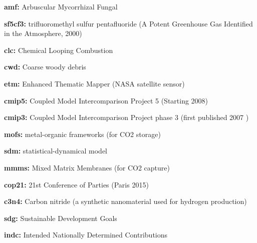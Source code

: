 \documentclass{article}
\begin{document}
\begin{linenumbers}
\noindent\textbf{amf:}  Arbuscular Mycorrhizal Fungal

\noindent\textbf{sf5cf3:} trifluoromethyl sulfur pentafluoride (A Potent Greenhouse Gas Identified in the Atmosphere, 2000)

\noindent\textbf{clc:} Chemical Looping Combustion

\noindent\textbf{cwd:} Coarse woody debris

\noindent\textbf{etm:} Enhanced Thematic Mapper (NASA satellite sensor)

\noindent\textbf{cmip5:} Coupled Model Intercomparison Project 5 (Starting 2008)

\noindent\textbf{cmip3:} Coupled Model Intercomparison Project phase 3 (first published 2007 \cite{Meehl2007})

\noindent\textbf{mofs:} metal-organic frameworks (for CO2 storage)

\noindent\textbf{sdm:} statistical-dynamical model

\noindent\textbf{mmms:} Mixed Matrix Membranes (for CO2 capture)

\noindent\textbf{cop21:} 21st Conference of Parties (Paris 2015) 

\noindent\textbf{c3n4:} Carbon nitride (a synthetic nanomaterial used for hydrogen production)

\noindent\textbf{sdg:} Sustainable Development Goals

\noindent\textbf{indc:} Intended Nationally Determined Contributions

		
	\end{linenumbers}

\linespread{1}
%
\end{document}
